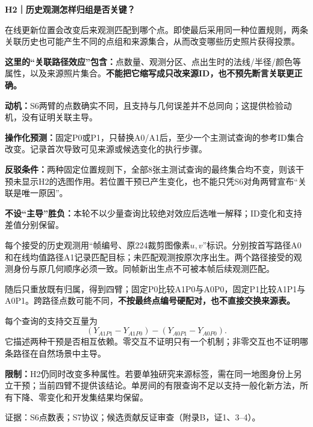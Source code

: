 \documentclass[11pt,a4paper,fontset=none]{ctexart}
\newcommand{\smallhead}[1]{\vspace{4pt}{\large\bfseries\color{hypothesis1}#1}\par}
\newcommand{\docref}[1]{{\small\color{darkgray}证据：#1。}}
\begin{document}
\newpage
{\LARGE\bfseries\color{hypothesis2}H2｜历史观测怎样归组是否关键？}\par
\begin{hypothesisbox2}[解释与成立前提]
在线更新位置会改变后来观测匹配到哪个点。即使最后采用同一种位置规则，两条关联历史也可能产生不同的点组和来源集合，从而改变哪些历史照片获得投票。

\textbf{这里的“关联路径效应”包含：}点数量、观测分区、点出生时的法线/半径/颜色等属性，以及来源照片集合。\textbf{不能把它缩写成只改来源ID，也不预先断言关联更正确。}

\textbf{动机：}S6两臂的点数确实不同，且支持与几何误差并不总同向；这提供检验动机，没有证明关联主导。
\end{hypothesisbox2}

\begin{predictionbox}[预测与可反驳条件]
\textbf{操作化预测：}固定P0或P1，只替换A0/A1后，至少一个主测试查询的参考ID集合改变。记录首次导致可见来源或候选变化的执行步骤。

\textbf{反驳条件：}两种固定位置规则下，全部8张主测试查询的最终集合均不变，则该干预未显示H2的选图作用。若位置干预已产生变化，也不能只凭S6对角两臂宣布“关联是唯一原因”。

\textbf{不设“主导”胜负：}本轮不以少量查询比较绝对效应后选唯一解释；ID变化和支持差值分别保留。
\end{predictionbox}

\smallhead{设计：先记住每个观测的固定身份}
每个接受的历史观测用“帧编号、原224裁剪图像素$u,v$”标识。分别按首写路径A0和在线均值路径A1记录匹配目标；未匹配观测按原次序出生。两个路径接受的观测身份与原几何顺序必须一致。同帧新出生点不可被本帧后续观测匹配。

随后只重放既有归属，得到四臂；固定P0比较A1P0与A0P0，固定P1比较A1P1与A0P1。跨路径点数可能不同，\textbf{不按最终点编号硬配对，也不直接交换来源表。}

\begin{comparisonbox}
每个查询的支持交互量为
\[
  (Y_{A1P1}-Y_{A1P0})-(Y_{A0P1}-Y_{A0P0}).
\]
它描述两种干预是否相互依赖。零交互不证明只有一个机制；非零交互也不证明哪条路径在自然场景中主导。
\end{comparisonbox}

\textbf{限制：}H2仍同时改变多种属性。若要单独研究来源标签，需在同一地图身份上另立干预；当前四臂不提供该结论。单房间的有限查询不足以支持一般化新方法，所有下降、零变化和开发集结果均保留。\par
\docref{S6点数表；S7协议；候选贡献反证审查（附录B，证1、3--4）}
\end{document}
